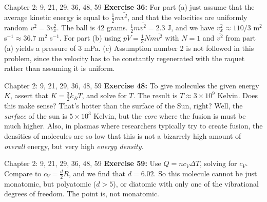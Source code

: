 \documentclass{beamer}
\begin{document}
\begin{frame}{Chapter 2: 9, 21, 29, 36, 48, 59}
\small
\textbf{Exercise 36:} For part (a) just assume that the average kinetic energy is equal to $\frac{1}{2}m\bar{v^2}$, and that the velocities are uniformly random $v^2 = 3 v_x^2$.  The ball is 42 grams. $\frac{1}{2}m\bar{v^2} = 2.3$ J, and we have $v_x^2 \approx 110/3$ m$^2$ s$^{-1} \approx 36.7$ m$^2$ s$^{-1}$. For part (b) using $pV = \frac{1}{3}N m \bar{v^2}$ with $N=1$ and $\bar{v^2}$ from part (a) yields a pressure of 3 mPa.  (c) Assumption number 2 is not followed in this problem, since the velocity has to be constantly regenerated with the raquet rather than assuming it is uniform.
\end{frame}

\begin{frame}{Chapter 2: 9, 21, 29, 36, 48, 59}
\small
\textbf{Exercise 48:} To give molecules the given energy $K$, assert that $K = \frac{3}{2}k_B T$, and solve for $T$.  The result is $T \approx 3 \times 10^9$ Kelvin.  Does this make sense?  That's hotter than the surface of the Sun, right?  Well, the \textit{surface} of the sun is $5\times 10^3$ Kelvin, but the \textit{core} where the fusion is must be much higher.  Also, in plasmas where researchers typically try to create fusion, the densities of molecules are so low that this is not a bizarrely high amount of \textit{overall} energy, but very high \textit{energy density.}
\end{frame}

\begin{frame}{Chapter 2: 9, 21, 29, 36, 48, 59}
\small
\textbf{Exercise 59:} Use $Q = n c_V \Delta T$, solving for $c_V$.  Compare to $c_V = \frac{d}{2}R$, and we find that $d = 6.02$.  So this molecule cannot be just monatomic, but polyatomic ($d>5$), or diatomic with only one of the vibrational degrees of freedom.  The point is, not monatomic.
\end{frame}
\end{document}

